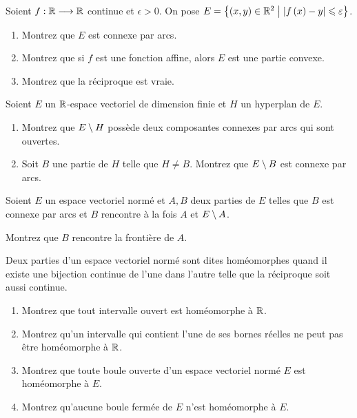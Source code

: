 \begin{exoss}[Exercice 27]
Soient \(f:\mathbb{R}\longrightarrow\mathbb{R}\) continue et \(\epsilon>0\). On pose \(E=\left\lbrace\left(x,y\right)\in\mathbb{R}^2\;\middle|\;\left\lvert f\left(x\right)-y\right\rvert\leqslant\varepsilon\right\rbrace\).

\begin{enumerate}
    \item Montrez que \(E\) est connexe par arcs. \\
    \item Montrez que si \(f\) est une fonction affine, alors \(E\) est une partie convexe. \\
    \item Montrez que la réciproque est vraie.
\end{enumerate}
\end{exoss}



\begin{exoss}[Exercice 28]
Soient \(E\) un \(\mathbb{R}\)-espace vectoriel de dimension finie et \(H\) un hyperplan de \(E\).

\begin{enumerate}
    \item Montrez que \(E\setminus H\) possède deux composantes connexes par arcs qui sont ouvertes. \\
    \item Soit \(B\) une partie de \(H\) telle que \(H\not=B\). Montrez que \(E\setminus B\) est connexe par arcs.
\end{enumerate}
\end{exoss}



\begin{exoss}[Exercice 29]
Soient \(E\) un espace vectoriel normé et \(A,B\) deux parties de \(E\) telles que \(B\) est connexe par arcs et \(B\) rencontre à la fois \(A\) et \(E\setminus A\).

Montrez que \(B\) rencontre la frontière de \(A\).
\end{exoss}



\begin{exoss}[Exercice 30]
Deux parties d'un espace vectoriel normé sont dites homéomorphes quand il existe une bijection continue de l'une dans l'autre telle que la réciproque soit aussi continue.

\begin{enumerate}
    \item Montrez que tout intervalle ouvert est homéomorphe à \(\mathbb{R}\). \\
    \item Montrez qu'un intervalle qui contient l'une de ses bornes réelles ne peut pas être homéomorphe à \(\mathbb{R}\). \\
    \item Montrez que toute boule ouverte d'un espace vectoriel normé \(E\) est homéomorphe à \(E\). \\
    \item Montrez qu'aucune boule fermée de \(E\) n'est homéomorphe à \(E\).
\end{enumerate}
\end{exoss}



